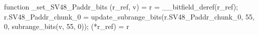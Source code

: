 function _set_SV48_Paddr_bits (r_ref, v) = {
    r = __bitfield_deref(r_ref);
    r.SV48_Paddr_chunk_0 = update_subrange_bits(r.SV48_Paddr_chunk_0, 55, 0, subrange_bits(v, 55, 0));
    (*r_ref) = r
}
